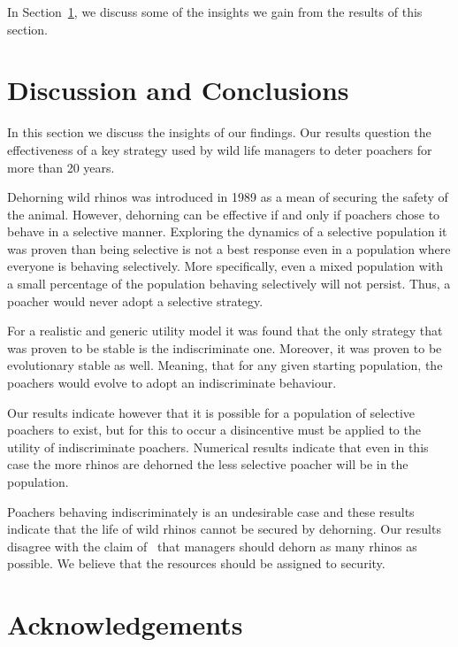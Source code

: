 \documentclass[10pt]{article}
\begin{document}
In Section~\ref{section:discussion}, we discuss some of the insights we
gain from the results of this section.

\section{Discussion and Conclusions}
\label{section:discussion}

In this section we discuss the insights of our findings. Our results question
the effectiveness of a key strategy used by wild life managers to deter poachers
for more than 20 years. 

Dehorning wild rhinos was introduced in 1989 as a mean of securing the
safety of the animal. However, dehorning can be effective if and only if
poachers chose to behave in a selective manner. Exploring the
dynamics of a selective population it was proven than being selective is not
a best response even in a population where everyone is behaving selectively.
More specifically, even a mixed population with a small percentage of the 
population behaving selectively will not persist. Thus, a poacher would never
adopt a selective strategy. 

For a realistic and generic utility model it was found that
the only strategy that was proven to be stable is the indiscriminate one.
Moreover, it was proven to be evolutionary stable as well. Meaning, 
that for any given starting population, the poachers would evolve to adopt an
indiscriminate behaviour.

Our results indicate however that it is possible for a population of selective
poachers to exist, but for this to occur a disincentive must be applied to the
utility of indiscriminate poachers. Numerical results indicate that even in this
case the more rhinos are dehorned the less selective poacher will be in the population.


Poachers behaving indiscriminately is an undesirable case and these results
indicate that the life of
wild rhinos cannot be secured by dehorning. Our results disagree with the
claim of~\cite{Milner1992} that managers should dehorn
as many rhinos as possible. We believe that the resources should be 
assigned to security.

\section*{Acknowledgements}
\end{document}
